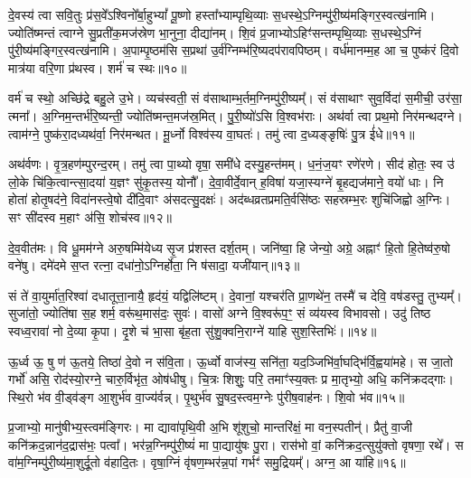 दे॒वस्य॑ त्वा सवि॒तुः प्र॑स॒वे᳚\-ऽश्विनो᳚र्बा॒हु\-भ्यां᳚ पू॒ष्णो हस्ता᳚भ्याम्पृथि॒व्याः स॒धस्थे॒\-ऽग्निम्पु॑री॒ष्य॑मङ्गिर॒स्व\-त्ख॑नामि। ज्योति॑ष्मन्तं त्वाग्ने सु॒प्रती॑क॒मज॑स्रेण भा॒नुना॒ दीद्या॑नम्। शि॒वं प्र॒जाभ्यो\-ऽहिꣳ॑सन्त\-म्पृथि॒व्याः स॒धस्थे॒\-ऽग्निं पु॑री॒ष्य॑मङ्गिर॒स्वत्ख॑नामि। अ॒पाम्पृ॒ष्ठम॑सि स॒प्रथा॑ उ॒र्व॑ग्निम्भ॑रि॒ष्यदप॑रावपिष्ठम्। वर्ध॑मानम्म॒ह आ च॒ पुष्क॑रं दि॒वो मात्र॑या वरि॒णा प्र॑थस्व। शर्म॑ च स्थः॥१०॥

वर्म॑ च स्थो॒ अच्छि॑द्रे बहु॒ले उ॒भे। व्यच॑स्वती॒ सं व॑साथाम्भ॒र्तम॒ग्निम्पु॑री॒ष्यम्᳚। सं व॑साथाꣳ सुव॒र्विदा॑ स॒मीची॒ उर॑सा॒ त्मना᳚। अ॒ग्निम॒न्तर्भ॑रि॒ष्यन्ती॒ ज्योति॑ष्मन्त॒मज॑स्र॒मित्। पु॒री॒ष्यो॑\-ऽसि वि॒श्वभ॑राः। अथ॑र्वा त्वा प्रथ॒मो निर॑मन्थदग्ने। त्वाम॑ग्ने॒ पुष्क॑रा॒दध्यथ॑र्वा॒ निर॑मन्थत। मू॒र्ध्नो विश्व॑स्य वा॒घतः॑। तमु॑ त्वा द॒ध्यङ्ङृषिः॑ पु॒त्र ई॑धे॥११॥

अथ॑र्वणः। वृ॒त्र॒हण॑म्पुरन्द॒रम्। तमु॑ त्वा पा॒थ्यो वृषा॒ समी॑धे दस्यु॒हन्त॑मम्। ध॒नं॒ज॒यꣳ रणे॑रणे। सीद॑ होतः॒ स्व उ॑ लो॒के चि॑कि॒त्वान्त्सा॒दया॑ य॒ज्ञꣳ सु॑कृ॒तस्य॒ योनौ᳚। दे॒वा॒वीर्दे॒वान् ह॒विषा॑ यजा॒स्यग्ने॑ बृ॒हद्यज॑माने॒ वयो॑ धाः। नि होता॑ होतृ॒षद॑ने॒ विदा॑नस्त्वे॒षो दी॑दि॒वाꣳ अ॑सदत्सु॒दक्षः॑। अद॑ब्धव्रतप्रमति॒र्वसि॑ष्ठः सहस्रम्भ॒रः शुचि॑जिह्वो अ॒ग्निः। सꣳ सी॑दस्व म॒हाꣳ अ॑सि॒ शोच॑स्व॥१२॥

दे॒व॒वीत॑मः। वि धू॒मम॑ग्ने अरु॒षम्मि॑येध्य सृ॒ज प्र॑शस्त दर्\mbox{}श॒तम्। जनि॑ष्वा॒ हि जेन्यो॒ अग्रे॒ अह्नाꣳ॑ हि॒तो हि॒तेष्व॑रु॒षो वने॑षु। दमे॑दमे स॒प्त रत्ना॒ दधा॑नो॒\-ऽग्निर्\mbox{}होता॒ नि ष॑सादा॒ यजी॑यान्॥१३॥

{\anuvakamend[{स्थ॒ ई॒धे॒ शोच॑स्व स॒प्तविꣳ॑शतिश्च॥३॥}]}

सं ते॑ वा॒युर्मा॑त॒रिश्वा॑ दधातूत्ता॒नायै॒ हृद॑यं॒ यद्विलि॑ष्टम्। दे॒वानां॒ यश्चर॑ति प्रा॒णथे॑न॒ तस्मै॑ च देवि॒ वष॑डस्तु॒ तुभ्यम्᳚। सुजा॑तो॒ ज्योति॑षा स॒ह शर्म॒ वरू॑थ॒मास॑दः॒ सुवः॑। वासो॑ अग्ने वि॒श्वरू॑प॒ꣳ॒ सं व्य॑यस्व विभावसो। उदु॑ तिष्ठ स्वध्व॒रावा॑ नो दे॒व्या कृ॒पा। दृ॒शे च॑ भा॒सा बृ॑ह॒ता सु॑शु॒क्वनि॒राग्ने॑ याहि सुश॒स्तिभिः॑।॥१४॥

ऊ॒र्ध्व ऊ॒ षु ण॑ ऊ॒तये॒ तिष्ठा॑ दे॒वो न स॑वि॒ता। ऊ॒र्ध्वो वाज॑स्य॒ सनि॑ता॒ यद॒ञ्जिभि॑र्वा॒घद्भि॑र्वि॒ह्वया॑महे। स जा॒तो गर्भो॑ असि॒ रोद॑स्यो॒रग्ने॒ चारु॒र्विभृ॑त॒ ओष॑धीषु। चि॒त्रः शिशुः॒ परि॒ तमाꣳ॑स्य॒क्तः प्र मा॒तृभ्यो॒ अधि॒ कनि॑क्रदद्गाः। स्थि॒रो भ॑व वी॒ड्व॑ङ्ग आ॒शुर्भ॑व वा॒ज्य॑र्वन्न्। पृ॒थुर्भ॑व सु॒षद॒स्त्वम॒ग्नेः पु॑रीष॒वाह॑नः। शि॒वो भ॑व॥१५॥

प्र॒जाभ्यो॒ मानु॑षीभ्य॒स्त्वम॑ङ्गिरः। मा द्यावा॑पृथि॒वी अ॒भि शू॑शुचो॒ मान्तरि॑क्षं॒ मा वन॒स्पतीन्॑। प्रैतु॑ वा॒जी कनि॑क्रद॒न्नान॑द॒द्रास॑भः॒ पत्वा᳚। भर॑न्न॒ग्निम्पु॑री॒ष्यं॑ मा पा॒द्यायु॑षः पु॒रा। रास॑भो वां॒ कनि॑क्रद॒त्सुयु॑क्तो वृषणा॒ रथे᳚। स वा॑म॒ग्निम्पु॑री॒ष्य॑मा॒शुर्दू॒तो व॑हादि॒तः। वृषा॒ग्निं वृ॑षण॒म्भर॑न्न॒पां गर्भꣳ॑ समु॒द्रियम्᳚। अग्न॒ आ या॑हि॥१६॥


